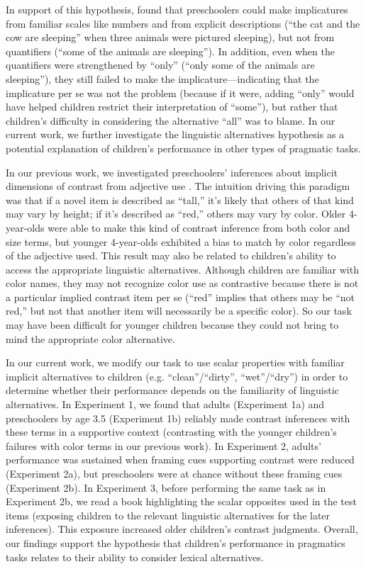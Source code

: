 \documentclass[10pt,letterpaper]{article}
\begin{document}
In support of this hypothesis,  found that preschoolers could make implicatures from familiar scales like numbers and from explicit descriptions (``the cat and the cow are sleeping'' when three animals were pictured sleeping), but not from quantifiers (``some of the animals are sleeping''). In addition, even when the quantifiers were strengthened by ``only'' (``only some of the animals are sleeping''), they still failed to make the implicature---indicating that the implicature per se was not the problem (because if it were, adding ``only'' would have helped children restrict their interpretation of ``some''), but rather that children's difficulty in considering the alternative ``all'' was to blame.  In our current work, we further investigate the linguistic alternatives hypothesis as a potential explanation of children's performance in other types of pragmatic tasks.  

In our previous work, we investigated preschoolers' inferences about implicit dimensions of contrast from adjective use \cite{horowitz2012}. The intuition driving this paradigm was that if a novel item is described as ``tall,'' it's likely that others of that kind may vary by height; if it's described as ``red,'' others may vary by color. Older 4-year-olds were able to make this kind of contrast inference from both color and size terms, but younger 4-year-olds exhibited a bias to match by color regardless of the adjective used. This result may also be related to children's ability to access the appropriate linguistic alternatives. Although children are familiar with color names, they may not recognize color use as contrastive because there is not a particular implied contrast item per se (``red'' implies that others may be ``not red,'' but not that another item will necessarily be a specific color). So our task may have been difficult for younger children because they could not bring to mind the appropriate color alternative. 

In our current work, we modify our task to use scalar properties with familiar implicit alternatives to children (e.g. ``clean''/``dirty'', ``wet''/``dry'') in order to determine whether their performance depends on the familiarity of linguistic alternatives. In Experiment 1, we found that adults (Experiment 1a) and preschoolers by age 3.5 (Experiment 1b) reliably made contrast inferences with these terms in a supportive context (contrasting with the younger children's failures with color terms in our previous work).  In Experiment 2, adults' performance was sustained when framing cues supporting contrast were reduced (Experiment 2a), but preschoolers were at chance without these framing cues (Experiment 2b).  In Experiment 3, before performing the same task as in Experiment 2b, we read a book highlighting the scalar opposites used in the test items (exposing children to the relevant linguistic alternatives for the later inferences). This exposure increased older children's contrast judgments.  Overall, our findings support the hypothesis that children's performance in pragmatics tasks relates to their ability to consider lexical alternatives.
\end{document}
